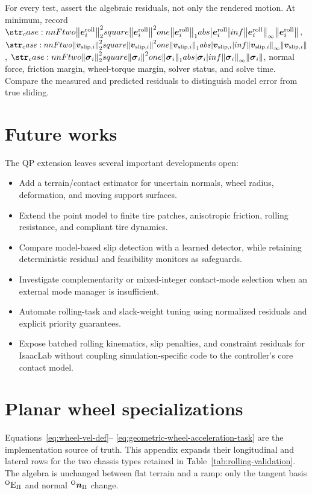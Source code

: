 \documentclass[10pt]{article}
\newcommand{\slipVelocity}[1]{\contactVel_{\text{slip},#1}}
\newcommand{\rollingResidual}{\bs{e}^{\text{roll}}}
\newcommand{\slackVariable}{\bs{\sigma}}
\begin{document}
For every test, assert the algebraic residuals, not only the rendered motion.
At minimum, record $\norm{\rollingResidual_i}$,
$\norm{\slipVelocity{i}}$, $\norm{\slackVariable_i}$, normal force, friction
margin, wheel-torque margin, solver status, and solve time. Compare the
measured and predicted residuals to distinguish model error from true sliding.

\section{Future works}

The QP extension leaves several important developments open:
\begin{itemize}
  \item Add a terrain/contact estimator for uncertain normals, wheel radius,
    deformation, and moving support surfaces.
  \item Extend the point model to finite tire patches, anisotropic friction,
    rolling resistance, and compliant tire dynamics.
  \item Compare model-based slip detection with a learned detector, while
    retaining deterministic residual and feasibility monitors as safeguards.
  \item Investigate complementarity or mixed-integer contact-mode selection
    when an external mode manager is insufficient.
  \item Automate rolling-task and slack-weight tuning using normalized residuals
    and explicit priority guarantees.
  \item Expose batched rolling kinematics, slip penalties, and constraint
    residuals for IsaacLab without coupling simulation-specific code to the
    controller's core contact model.
\end{itemize}




\appendix
\section{Planar wheel specializations}
\label{app:rolling-specializations}

Equations~\eqref{eq:wheel-vel-def}--
\eqref{eq:geometric-wheel-acceleration-task} are the implementation source of
truth. This appendix expands their longitudinal and lateral rows for the two
chassis types retained in Table~\ref{tab:rolling-validation}. The algebra is
unchanged between flat terrain and a ramp: only the tangent basis
${}^{\text{O}}\text{E}_{\Pi}$ and normal
${}^{\text{O}}\boldsymbol{n}_{\Pi}$ change.
\end{document}
